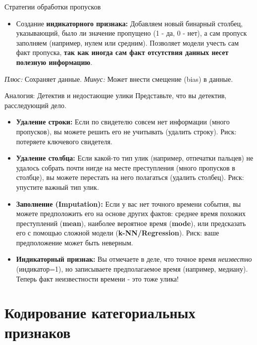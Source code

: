 \begin{textbox}{Стратегии обработки пропусков}
\begin{enumerate}
\begin{itemize}
\begin{itemize}
                        \item Создание \textbf{индикаторного признака:} Добавляем новый бинарный столбец, указывающий, было ли значение пропущено (1 - да, 0 - нет), а сам пропуск заполняем (например, нулем или средним). Позволяет модели учесть сам факт пропуска, \textbf{так как иногда сам факт отсутствия данных несет полезную информацию}.
                    \end{itemize}
            \end{itemize}
            \textit{Плюс:} Сохраняет данные. \textit{Минус:} Может внести смещение (bias) в данные.
    \end{enumerate}
\end{textbox}

\begin{myexampleblock}{Аналогия: Детектив и недостающие улики}
    Представьте, что вы детектив, расследующий дело.
    \begin{itemize}
        \item \textbf{Удаление строки:} Если по свидетелю совсем нет информации (много пропусков), вы можете решить его не учитывать (удалить строку). Риск: потеряете ключевого свидетеля.
        \item \textbf{Удаление столбца:} Если какой-то тип улик (например, отпечатки пальцев) не удалось собрать почти нигде на месте преступления (много пропусков в столбце), вы можете перестать на него полагаться (удалить столбец). Риск: упустите важный тип улик.
        \item \textbf{Заполнение (Imputation):} Если у вас нет точного времени события, вы можете предположить его на основе других фактов: среднее время похожих преступлений (\textbf{mean}), наиболее вероятное время (\textbf{mode}), или предсказать его с помощью сложной модели (\textbf{k-NN/Regression}). Риск: ваше предположение может быть неверным.
        \item \textbf{Индикаторный признак:} Вы отмечаете в деле, что точное время \textit{неизвестно} (индикатор=1), но записываете предполагаемое время (например, медиану). Теперь факт неизвестности времени - это тоже улика!
    \end{itemize}
\end{myexampleblock}

\section{Кодирование категориальных признаков}

